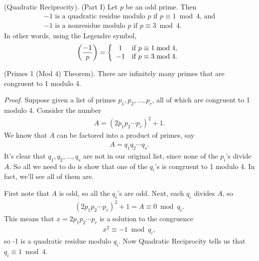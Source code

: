 \documentclass[graybox]{svmult}
\begin{document}
\begin{svgraybox}
\begin{theorem}
(Quadratic Reciprocity). (Part I) Let $p$ be an odd prime. Then
\begin{align*}
-1 \text{ is a quadratic residue modulo } p \text{ if } p \equiv 1 \bmod 4 \text{, and} \\
-1 \text{ is a nonresidue modulo } p \text{ if } p \equiv 3 \bmod 4.
\end{align*}
In other words, using the Legendre symbol,
\begin{align*}
\left(\frac{-1}{p}\right) = \left\{
\begin{array}{c l}
    1 & \text{if } p \equiv 1 \bmod 4, \\
    -1 & \text{if } p \equiv 3 \bmod 4.
\end{array}\right.
\end{align*}
\end{theorem}
\end{svgraybox}

\begin{theorem}
(Primes 1 (Mod 4) Theorem). There are infinitely many primes that are congruent to 1 modulo 4.
\end{theorem}

\textit{Proof.} Suppose given a list of primes $p_1, p_2, \ldots, p_r$, all of which are congruent to 1 modulo 4. Consider the number
\begin{align*}
A = (2p_1p_2\cdots p_r)^2 +1.
\end{align*}
We know that $A$ can be factored into a product of primes, say
\begin{align*}
A = q_1q_2\cdots q_s.
\end{align*}
It's clear that $q_1, q_2, \ldots, q_s$ are not in our original list, since none of the $p_i$'s divide $A$. So all we need to do is show that one of the $q_i$'s is congruent to 1 modulo 4. In fact, we'll see all of them are.

First note that $A$ is odd, so all the $q_i$'s are odd. Next, each $q_i$ divides $A$, so
\begin{align*}
(2p_1p_2\cdots p_r)^2 + 1 = A \equiv 0 \bmod q_i.
\end{align*}
This means that $x = 2p_1p_2\cdots p_r$ is a solution to the congruence
\begin{align*}
x^2 \equiv -1 \bmod q_i,
\end{align*}
so -1 is a quadratic residue modulo $q_i$. Now Quadratic Reciprocity tells us that $q_i \equiv 1 \bmod 4$.
\end{document}

